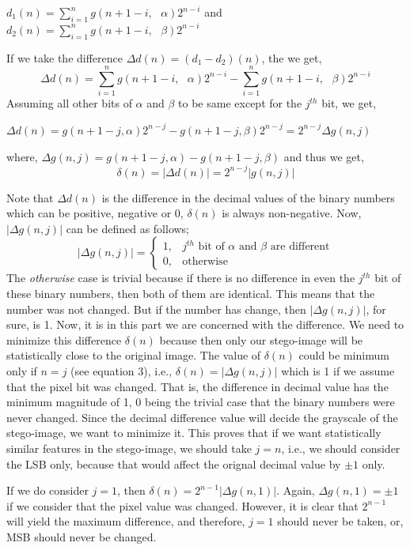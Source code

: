 \documentclass{report}
\begin{document}
\begin{center}
$\displaystyle d_{1}(n) =\sum_{i=1}^{n}g(n+1-i,\textrm{ } \alpha)2^{n-i}$ and
$\displaystyle d_{2}(n) =\sum_{i=1}^{n}g(n+1-i,\textrm{ } \beta)2^{n-i}$
\end{center}
If we take the difference $\Delta d(n) = (d_{1} - d_{2})(n)$, the we get,
\begin{equation}
\displaystyle \Delta d(n) =\sum_{i=1}^{n}g(n+1-i,\textrm{ } \alpha)2^{n-i} - \sum_{i=1}^{n}g(n+1-i,\textrm{ } \beta)2^{n-i}
\end{equation}
Assuming all other bits of $\alpha$ and $\beta$ to be same except for the $j^{th}$ bit, we get,
\begin{center}
$\displaystyle \Delta d(n) = g(n+1-j, \alpha)2^{n-j} - g(n+1-j, \beta)2^{n-j} = 2^{n-j} \Delta g(n, j)$ 
\end{center}
where, $\Delta g(n, j) = g(n+1-j, \alpha) - g(n+1-j, \beta)$ and thus we get,
\begin{equation}
\displaystyle \delta (n) = |\Delta d(n)| = 2^{n-j}|g(n, j)|
\end{equation}

Note that $\Delta d(n)$ is the difference in the decimal values of the binary numbers which can be positive, negative or 0, $\delta (n)$ is always non-negative. Now, $|\Delta g(n, j)|$ can be defined as follows;
\[
|\Delta g(n, j)| = 
\begin{cases}
1, & j^{th} \text{ bit of $\alpha$ and $\beta$ are different} \\
0, & \text{otherwise}
\end{cases}
\]
The {\it otherwise} case is trivial because if there is no difference in even the $j^{th}$ bit of these binary numbers, then both of them are identical. This means that the number was not changed. But if the number has change, then $|\Delta g(n, j)|$, for sure, is 1. Now, it is in this part we are concerned with the difference. We need to minimize this difference $\delta(n)$ because then only our stego-image will be statistically close to the original image. The value of $\delta(n)$ could be minimum only if $n=j$ (see equation 3), i.e., $\delta(n) = |\Delta g(n, j)|$ which is 1 if we assume that the pixel bit was changed. That is, the difference in decimal value has the minimum magnitude of 1, 0 being the trivial case that the binary numbers were never changed. Since the decimal difference value will decide the grayscale of the stego-image, we want to minimize it. This proves that if we want statistically similar features in the stego-image, we should take $j=n$, i.e., we should consider the LSB only, because that would affect the orignal decimal value by $\pm 1$ only. \par If we do consider $j=1$, then $\delta(n) = 2^{n-1} |\Delta g(n, 1)|$. Again, $\Delta g(n, 1) = \pm 1$ if we consider that the pixel value was changed. However, it is clear that $2^{n-1}$ will yield the maximum difference, and therefore, $j=1$ should never be taken, or, MSB should never be changed.
\end{document}
